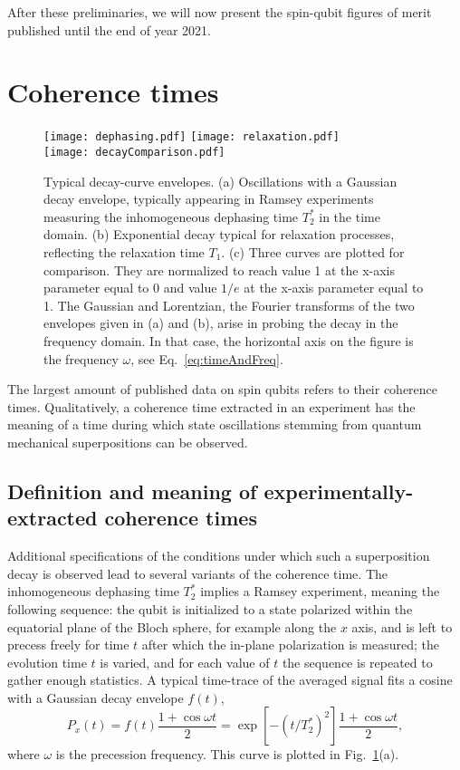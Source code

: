 \documentclass[aps, prx, showpacs, twocolumn, superscriptaddress, notitlepage, longbibliography, floatfix, nofootinbib]{revtex4-2}
\newcommand{\recheck}[1]{{#1}}
\newcommand{\separate}[1]
{
 #1
}
\begin{document}
\separate{
After these preliminaries, we will now present the spin-qubit figures of merit published until \recheck{the end of year 2021}.
}

\section{Coherence times}

\label{sec:coherence}

\begin{figure}
\centering
  \texttt{[image: dephasing.pdf]} \hfill
  \texttt{[image: relaxation.pdf]} \hfill\\
  \texttt{[image: decayComparison.pdf]} \hfill
  \caption{\label{fig:envelopes} Typical decay-curve envelopes. (a) Oscillations with a Gaussian decay envelope, typically appearing in Ramsey experiments measuring the inhomogeneous dephasing time $T_2^*$ in the time domain. (b) Exponential decay typical for relaxation processes, reflecting the relaxation time $T_1$. (c) Three curves are plotted for comparison. They are normalized to reach value 1 at the x-axis parameter equal to 0 and value $1/e$ at the x-axis parameter equal to 1. The Gaussian and Lorentzian, the Fourier transforms of the two envelopes given in (a) and (b), arise in probing the decay in the frequency domain. In that case, the horizontal axis on the figure is the frequency $\omega$, see Eq.~\eqref{eq:timeAndFreq}.}
\end{figure}

The largest amount of published data on spin qubits refers to their coherence times. Qualitatively, a coherence time extracted in an experiment has the meaning of a time during which state oscillations stemming from quantum mechanical superpositions can be observed. 

\subsection{Definition and meaning of experimentally-extracted coherence times}

Additional specifications of the conditions under which such a superposition decay is observed lead to several variants of the coherence time. The inhomogeneous dephasing time $T_2^*$ implies a Ramsey experiment, meaning the following sequence: the qubit is initialized to a state polarized within the equatorial plane of the Bloch sphere, for example along the $x$ axis, and is left to precess freely for time $t$ after which the in-plane polarization is measured; the evolution time $t$ is varied, and for each value of $t$ the sequence is repeated to gather enough statistics. A typical time-trace of the averaged signal fits a cosine with a Gaussian decay envelope $f(t)$,
\begin{equation}
P_x(t) = f(t)\frac{1+\cos \omega t}{2} = \exp\left[-(t / T_2^*)^2\right] \frac{1+\cos \omega t}{2},
\label{eq:dephasing}
\end{equation}
where $\omega$ is the precession frequency. This curve is plotted in Fig.~\ref{fig:envelopes}(a). 
\end{document}
